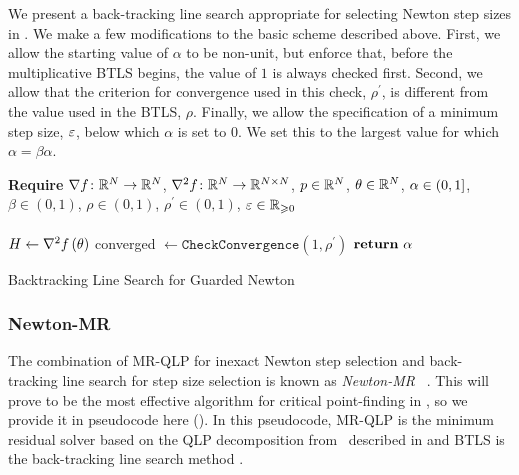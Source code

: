 \documentclass[../../thesis.tex]{subfiles}
\begin{document}
We present a back-tracking line search
appropriate for selecting Newton step sizes
in .
We make a few modifications to the basic scheme described above.
First, we allow the starting value of $\alpha$ to be non-unit,
but enforce that, before the multiplicative BTLS begins,
the value of $1$ is always checked first.
Second, we allow that
the criterion for convergence used in this check,
$\rho^\prime$,
is different from the value
used in the BTLS, $\rho$.
Finally,
we allow the specification of a minimum step size, $\varepsilon$,
below which $\alpha$ is set to $0$.
We set this to the largest value for which
$\alpha = \beta\alpha$.
\\
\begin{algorithm}[h]
    \SetAlgoLined{}
    \textbf{Require}
    $\nabla f\colon\mathbb{R}^N\to\mathbb{R}^N$,
    $\nabla^2 f\colon\mathbb{R}^N\to\mathbb{R}^{N\times N}$,
    $p \in \mathbb{R}^N$,
    $\theta \in \mathbb{R}^N$,
    $\alpha \in \intervaloc{0}{1}$,
    $\beta \in (0, 1)$,
    $\rho \in (0, 1)$,
    $\rho^\prime \in (0, 1)$,
    $\varepsilon \in \mathbb{R}_{\geqslant 0}$\\ \ \\
    \DontPrintSemicolon
    $H \leftarrow \nabla^2f\left(\theta\right)$\;
    \;
    converged $\leftarrow \texttt{CheckConvergence}\left(
    	1, \rho^\prime\right)$\;
    $\KwRet\ \alpha$%
    \caption{Backtracking Line Search for Guarded Newton}
\end{algorithm}

\subsubsection{Newton-MR}

The combination of MR-QLP
for inexact Newton step selection
and back-tracking line search
for step size selection
is known as \emph{Newton-MR}%
~\cite{roosta2018}.
This will prove to be the most effective
algorithm for critical point-finding in
,
so we provide it in pseudocode here
().
In this pseudocode,
MR-QLP is the minimum residual solver
based on the QLP decomposition
from~\cite{choi2011}
described in  and
BTLS is the back-tracking line search method
.
\end{document}
